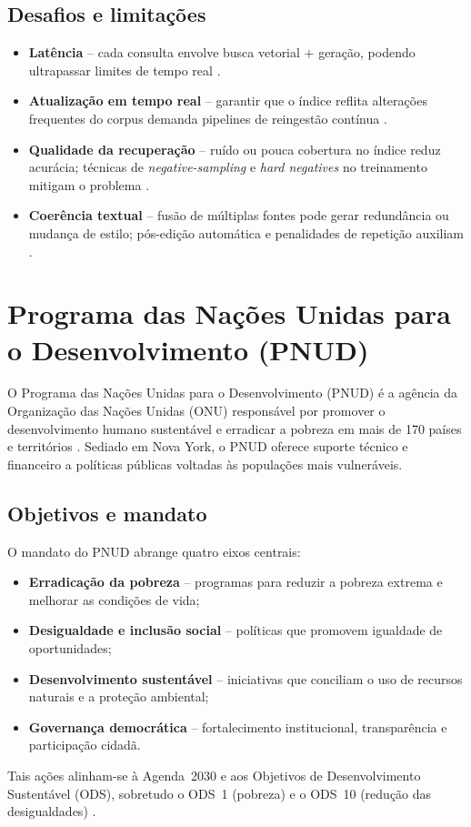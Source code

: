 \subsection{Desafios e limitações}
\begin{itemize}
  \item \textbf{Latência} – cada consulta envolve busca vetorial $+$ geração,
        podendo ultrapassar limites de tempo real
        \cite{scalable2025overload}.
  \item \textbf{Atualização em tempo real} – garantir que o índice reflita
        alterações frequentes do corpus demanda pipelines de reingestão
        contínua \cite{taipalus2024vector}.
  \item \textbf{Qualidade da recuperação} – ruído ou pouca cobertura no índice
        reduz acurácia; técnicas de \textit{negative-sampling} e \textit{hard
        negatives} no treinamento mitigam o problema
        \cite{gao2023survey,salemi2024hallucination}.
  \item \textbf{Coerência textual} – fusão de múltiplas fontes pode gerar
        redundância ou mudança de estilo; pós-edição automática e
        penalidades de repetição auxiliam \cite{zhang2025fine}.
\end{itemize}

\section{Programa das Nações Unidas para o Desenvolvimento (PNUD)}
\label{sec:pnud}

O Programa das Nações Unidas para o Desenvolvimento (PNUD) é a agência da
Organização das Nações Unidas (ONU) responsável por promover o desenvolvimento
humano sustentável e erradicar a pobreza em mais de 170 países e territórios
\cite{undp2025sobre,undp2025onu}. Sediado em Nova York, o PNUD oferece suporte
técnico e financeiro a políticas públicas voltadas às populações mais
vulneráveis.

\subsection{Objetivos e mandato}
O mandato do PNUD abrange quatro eixos centrais:
\begin{itemize}
  \item \textbf{Erradicação da pobreza} – programas para reduzir a pobreza
  extrema e melhorar as condições de vida;
  \item \textbf{Desigualdade e inclusão social} – políticas que promovem
  igualdade de oportunidades;
  \item \textbf{Desenvolvimento sustentável} – iniciativas que conciliam o uso
  de recursos naturais e a proteção ambiental;
  \item \textbf{Governança democrática} – fortalecimento institucional,
  transparência e participação cidadã.
\end{itemize}
Tais ações alinham-se à Agenda~2030 e aos Objetivos de Desenvolvimento
Sustentável (ODS), sobretudo o ODS~1 (pobreza) e o ODS~10 (redução das
desigualdades) \cite{wikipedia2025pnud}.

